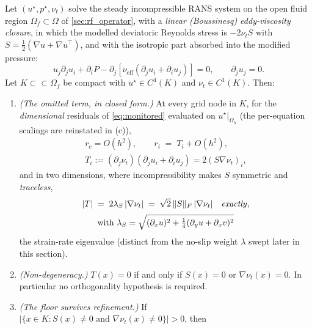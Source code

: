 \begin{theorem}
\label{thm:consistency-floor}
Let $(u^\star,p^\star,\nu_t)$ solve the steady incompressible RANS system on the open fluid
region $\Omega_f\subset\Omega$ of \autoref{sec:rf_operator}, with a \emph{linear
(Boussinesq) eddy-viscosity closure}, in which the
modelled deviatoric Reynolds stress is $-2\nu_tS$ with $S=\tfrac12(\nabla u+\nabla u^\top)$,
and with the isotropic part absorbed into the modified pressure:
\begin{equation}
u_j\partial_ju_i+\partial_iP-\partial_j\!\left[\nu_{\mathrm{eff}}(\partial_ju_i+\partial_iu_j)\right]=0,
\qquad \partial_ju_j=0 .
\label{eq:rans}
\end{equation}
Let $K\subset\subset\Omega_f$ be compact with $u^\star\in C^4(K)$ and $\nu_t\in C^1(K)$.
Then:
\begin{enumerate}
\item[\textup{(a)}] \emph{(The omitted term, in closed form.)} At every grid node in $K$,
for the \emph{dimensional} residuals of \eqref{eq:monitored} evaluated on
$u^\star|_{\Omega_h}$ (the per-equation scalings are reinstated in (c)),
\begin{equation}
\begin{gathered}
r_c=O(h^2),\qquad r_i \;=\; T_i+O(h^2),\\[2pt]
T_i:=(\partial_j\nu_t)(\partial_ju_i+\partial_iu_j)=2(S\nabla\nu_t)_i ,
\end{gathered}
\label{eq:omitted-term}
\end{equation}
and in two dimensions, where incompressibility makes $S$ symmetric and \emph{traceless},
\begin{equation}
\begin{gathered}
|T| \;=\; 2\lambda_S\,|\nabla\nu_t| \;=\; \sqrt{2}\,\|S\|_F\,|\nabla\nu_t|
\quad\text{\emph{exactly}},\\[2pt]
\text{with }\lambda_S=\sqrt{(\partial_xu)^2+\tfrac14(\partial_yu+\partial_xv)^2}
\end{gathered}
\label{eq:2d-identity}
\end{equation}
the strain-rate eigenvalue (distinct from the no-slip weight $\lambda$ swept later in this
section).
\item[\textup{(b)}] \emph{(Non-degeneracy.)} $T(x)=0$ if and only if $S(x)=0$ or
$\nabla\nu_t(x)=0$. In particular no orthogonality hypothesis is required.
\item[\textup{(c)}] \emph{(The floor survives refinement.)} If
$\bigl|\{x\in K: S(x)\neq0 \text{ and } \nabla\nu_t(x)\neq0\}\bigr|>0$, then

\end{enumerate}
\end{theorem}
